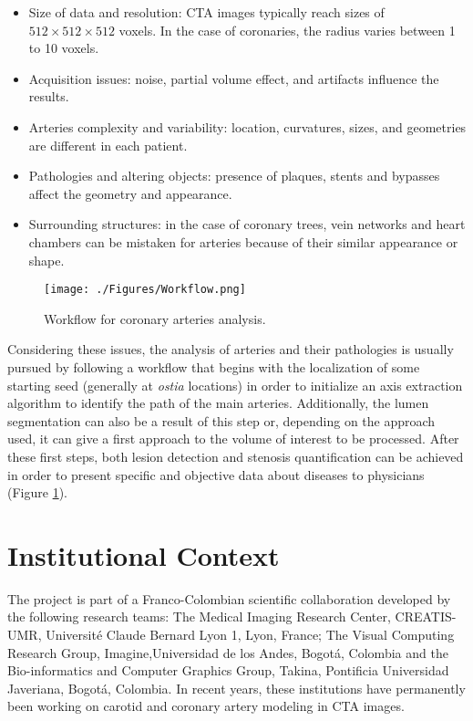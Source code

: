 \begin{itemize}
	\item Size of data and resolution: CTA images typically reach sizes of $512\times512\times512$ voxels. In the case of coronaries, the radius varies between 1 to 10 voxels.	
	\item Acquisition issues: noise, partial volume effect, and artifacts influence the results.	
	\item Arteries complexity and variability: location, curvatures, sizes, and geometries are different in each patient.
	\item Pathologies and altering objects: presence of plaques, stents and bypasses affect the geometry and appearance.
	\item Surrounding structures: in the case of coronary trees, vein networks and heart chambers can be mistaken for arteries because of their similar appearance or shape. 
\end{itemize}

\begin{figure}[htbp]
	\centering
		\texttt{[image: ./Figures/Workflow.png]}
	\caption[Workflow for coronary arteries analysis.]{Workflow for coronary arteries analysis.}
	\label{fig:Workflow}
\end{figure}

Considering these issues, the analysis of arteries and their pathologies is usually pursued by following a workflow that begins with the localization of some starting seed (generally at \textit{ostia} locations) in order to initialize an axis extraction algorithm to identify the path of the main arteries. Additionally, the lumen segmentation can also be a result of this step or, depending on the approach used, it can give a first approach to the volume of interest to be processed. After these first steps, both lesion detection and stenosis quantification can be achieved in order to present specific and objective data about diseases to physicians (Figure \ref{fig:Workflow}).


\section{Institutional Context}
%
The project is part of a Franco-Colombian scientific collaboration developed by the following research teams: The Medical Imaging Research Center, CREATIS-UMR, Universit\'{e} Claude Bernard Lyon 1, Lyon, France; The Visual Computing Research Group, Imagine,Universidad de los Andes, Bogot\'{a}, Colombia and the Bio-informatics and Computer Graphics Group, Takina, Pontificia Universidad Javeriana, Bogot\'{a}, Colombia. In recent years, these institutions have permanently been working on carotid and coronary artery modeling in CTA images.

